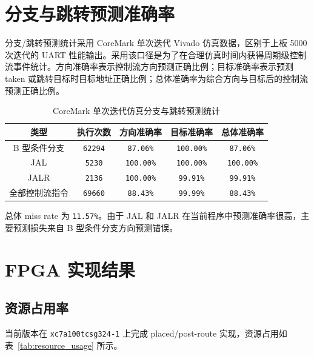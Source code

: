 ﻿\documentclass[UTF8,a4paper,12pt]{ctexart}
\begin{document}
\section{分支与跳转预测准确率}

分支/跳转预测统计采用 CoreMark 单次迭代 Vivado 仿真数据，区别于上板 5000 次迭代的 UART 性能输出。采用该口径是为了在合理仿真时间内获得周期级控制流事件统计。方向准确率表示控制流方向预测正确比例；目标准确率表示预测 taken 或跳转目标时目标地址正确比例；总体准确率为综合方向与目标后的控制流预测正确比例。

\begin{table}[htbp]
    \centering
    \caption{CoreMark 单次迭代仿真分支与跳转预测统计}
    \begin{tabular}{ccccc}
        \toprule
        类型 & 执行次数 & 方向准确率 & 目标准确率 & 总体准确率 \\
        \midrule
        B 型条件分支 & \texttt{62294} & \texttt{87.06\%} & \texttt{100.00\%} & \texttt{87.06\%} \\
        JAL & \texttt{5230} & \texttt{100.00\%} & \texttt{100.00\%} & \texttt{100.00\%} \\
        JALR & \texttt{2136} & \texttt{100.00\%} & \texttt{99.91\%} & \texttt{99.91\%} \\
        \midrule
        全部控制流指令 & \texttt{69660} & \texttt{88.43\%} & \texttt{99.99\%} & \texttt{88.43\%} \\
        \bottomrule
    \end{tabular}
\end{table}

总体 miss rate 为 \texttt{11.57\%}。由于 JAL 和 JALR 在当前程序中预测准确率很高，主要预测损失来自 B 型条件分支方向预测错误。

\section{FPGA 实现结果}

\subsection{资源占用率}

当前版本在 \texttt{xc7a100tcsg324-1} 上完成 placed/post-route 实现，资源占用如表~\ref{tab:resource_usage} 所示。
\end{document}
